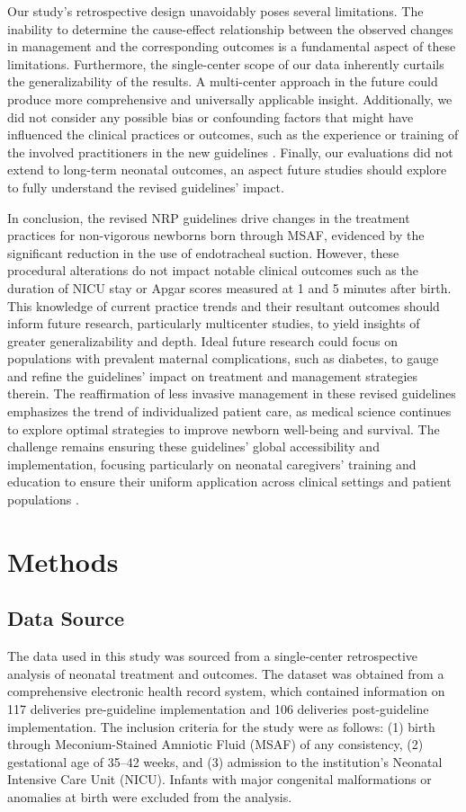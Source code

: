 \documentclass[11pt]{article}
\begin{document}
Our study's retrospective design unavoidably poses several limitations. The inability to determine the cause-effect relationship between the observed changes in management and the corresponding outcomes is a fundamental aspect of these limitations. Furthermore, the single-center scope of our data inherently curtails the generalizability of the results. A multi-center approach in the future could produce more comprehensive and universally applicable insight. Additionally, we did not consider any possible bias or confounding factors that might have influenced the clinical practices or outcomes, such as the experience or training of the involved practitioners in the new guidelines \cite{Zhu2020ClinicalAO}. Finally, our evaluations did not extend to long-term neonatal outcomes, an aspect future studies should explore to fully understand the revised guidelines' impact.

In conclusion, the revised NRP guidelines drive changes in the treatment practices for non-vigorous newborns born through MSAF, evidenced by the significant reduction in the use of endotracheal suction. However, these procedural alterations do not impact notable clinical outcomes such as the duration of NICU stay or Apgar scores measured at 1 and 5 minutes after birth. This knowledge of current practice trends and their resultant outcomes should inform future research, particularly multicenter studies, to yield insights of greater generalizability and depth. Ideal future research could focus on populations with prevalent maternal complications, such as diabetes, to gauge and refine the guidelines' impact on treatment and management strategies therein. The reaffirmation of less invasive management in these revised guidelines emphasizes the trend of individualized patient care, as medical science continues to explore optimal strategies to improve newborn well-being and survival. The challenge remains ensuring these guidelines' global accessibility and implementation, focusing particularly on neonatal caregivers' training and education to ensure their uniform application across clinical settings and patient populations \cite{Brierley2009ClinicalPP}.

\section*{Methods}

\subsection*{Data Source}
The data used in this study was sourced from a single-center retrospective analysis of neonatal treatment and outcomes. The dataset was obtained from a comprehensive electronic health record system, which contained information on 117 deliveries pre-guideline implementation and 106 deliveries post-guideline implementation. The inclusion criteria for the study were as follows: (1) birth through Meconium-Stained Amniotic Fluid (MSAF) of any consistency, (2) gestational age of 35–42 weeks, and (3) admission to the institution’s Neonatal Intensive Care Unit (NICU). Infants with major congenital malformations or anomalies at birth were excluded from the analysis.
\end{document}
